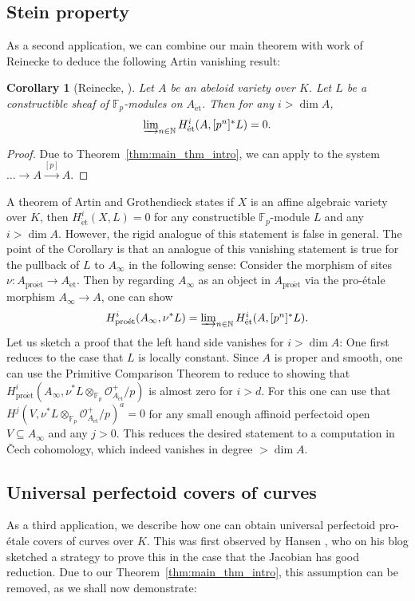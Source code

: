 \documentclass[10pt,oneside]{amsart}
\newtheorem{corollary}[theorem]{Corollary}
\theoremstyle{definition}
\newcommand{\et}{\operatorname{\acute{e}t}}
\newcommand{\proet}{\operatorname{pro\acute{e}t}}
\renewcommand{\O}{\mathcal{O}}
\newcommand{\N}{\mathbb{N}}
\newcommand{\F}{\mathbb{F}}
\begin{document}
	\subsection{Stein property}
	As a second application, we can combine our main theorem with work of Reinecke to deduce the following Artin vanishing result:
	\begin{corollary}[Reinecke, \cite{Reinecke}]
		Let $A$ be an abeloid variety over $K$. Let $L$ be a constructible sheaf of $\mathbb F_p$-modules on $A_{\et}$. Then for any $i>\dim A$,
		\[\textstyle\varinjlim_{n\in \mathbb N}H_{\et}^i(A,[p^n]^{\ast}L)=0.\]
	\end{corollary}
	\begin{proof}
	Due to Theorem~\ref{thm:main_thm_intro}, we can apply \cite[Theorem~3.3]{Reinecke} to the system $\dots \rightarrow A\xrightarrow{[p]}A$.
	\end{proof}
	A theorem of Artin and Grothendieck states if $X$ is an affine algebraic variety over $K$, then $H_{\et}^i(X,L)=0$ for any constructible $\mathbb F_p$-module $L$ and any $i>\dim A$. However, the rigid analogue of this statement is false in general. The point of the Corollary is that an analogue of this vanishing statement is true for the pullback of $L$ to $A_\infty$ in the following sense: Consider the morphism of sites $\nu\colon A_{\proet}\to A_{\et}$. Then by regarding $A_\infty$ as an object in $A_{\proet}$ via the pro-\'etale morphism $A_\infty\to A$, one can show
	\[H^i_{\proet}(A_\infty,\nu^{\ast}L)=\textstyle\varinjlim_{n\in\N} H^i_{\et}(A,[p^n]^{\ast}L). \]
	Let us sketch a proof that the left hand side vanishes  for $i>\dim A$: One first reduces to the case that $L$ is locally constant.
	Since $A$ is proper and smooth, one can use the Primitive Comparison Theorem \cite[Theorem~5.1]{p-adic_Hodge} \cite[Theorem~3.13]{survey} to reduce to showing that $H^i_{\proet}(A_\infty,\nu^{\ast}L\otimes_{\F_p} \O_{A_{\et}}^+/p)$ is almost zero for $i>d$. For this one can use that $H^j(V,\nu^{\ast}L\otimes_{\F_p} \O_{A_{\et}}^+/p)^a=0$ for any small enough affinoid perfectoid open $V\subseteq A_\infty$ and any $j>0$. This reduces the desired statement to a computation in \v{C}ech cohomology, which indeed vanishes in degree $>\dim A$.
	\subsection{Universal perfectoid covers of curves}
	
As a third application, we describe how one can obtain universal perfectoid pro-\'etale covers of curves over $K$. This was first observed by Hansen \cite{Hansen-blog}, who on his blog sketched a strategy to prove this in the case that the Jacobian has good reduction. Due to our Theorem~\ref{thm:main_thm_intro}, this assumption can be removed, as we shall now demonstrate:
	
\end{document}
